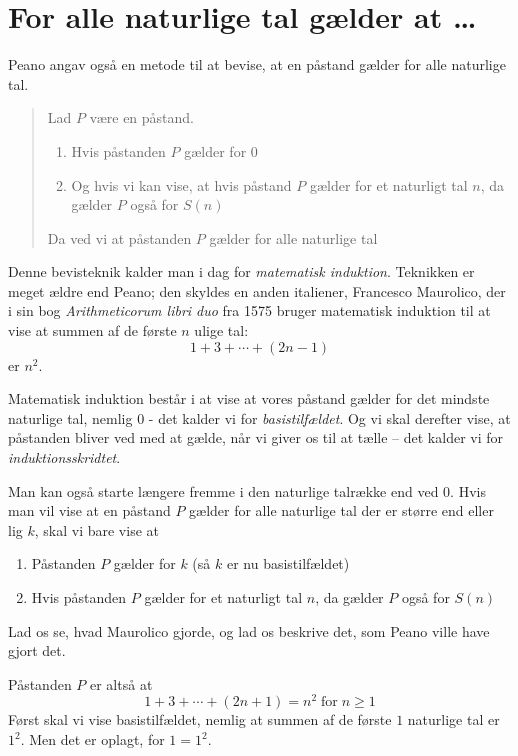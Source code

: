 \section{For alle naturlige tal gælder at \ldots}

Peano angav også en metode til at bevise, at en påstand gælder for alle naturlige tal. 

\begin{quote}
Lad $P$ være en påstand.
    \begin{enumerate}
    \item Hvis påstanden $P$ gælder for $0$
    \item Og hvis vi kan vise, at hvis påstand $P$ gælder for et naturligt tal $n$, da gælder $P$ også for $S(n)$    
\end{enumerate}
Da ved vi at påstanden $P$ gælder for alle naturlige tal
\end{quote}

Denne bevisteknik kalder man i dag for \emph{matematisk induktion}. Teknikken er meget ældre end Peano; den skyldes en anden italiener, Francesco Maurolico, der i sin bog \emph{Arithmeticorum libri duo} fra 1575 bruger matematisk induktion til at vise at summen af de første $n$ ulige tal:
%
\[ 1 + 3 + \cdots + (2n-1)  \]
%
er $n^2$. 

Matematisk induktion består i at vise at vores påstand gælder for det mindste naturlige tal, nemlig $0$ - det kalder vi for \emph{basistilfældet}. Og vi skal derefter vise, at påstanden bliver ved med at gælde, når vi giver os til at tælle -- det kalder vi for \emph{induktionsskridtet}.

Man kan også starte længere fremme i den naturlige talrække end ved $0$. Hvis man vil vise at en påstand $P$ gælder for alle naturlige tal der er større end eller lig $k$, skal vi bare vise at 

 \begin{enumerate}
    \item Påstanden $P$ gælder for $k$ (så $k$ er nu basistilfældet)
    \item Hvis påstanden $P$ gælder for et naturligt tal $n$, da gælder $P$ også for $S(n)$    
\end{enumerate}

Lad os se, hvad Maurolico gjorde, og lad os beskrive det, som Peano ville have gjort det.

Påstanden $P$ er altså at 
%
\[ 1 + 3 + \cdots + (2n+1) = n^2  \;\text{for}\; n \geq 1\]
%
Først skal vi vise basistilfældet, nemlig at summen af de første $1$ naturlige tal er $1^2$. Men det er oplagt, for $1 = 1^2$.

